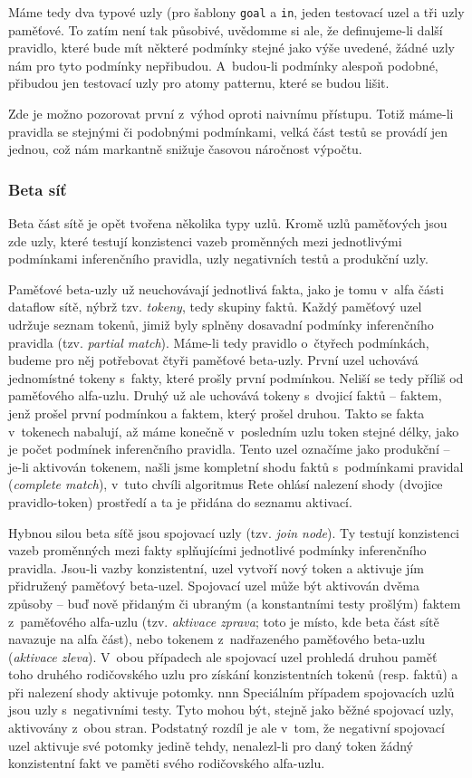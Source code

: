Máme tedy dva typové uzly (pro šablony \verb|goal| a \verb|in|, jeden
testovací uzel a tři uzly paměťové. To zatím není tak působivé,
uvědomme si ale, že definujeme-li další pravidlo, které bude mít
některé podmínky stejné jako výše uvedené, žádné uzly nám pro tyto
podmínky nepřibudou. A~budou-li podmínky alespoň podobné, přibudou
jen testovací uzly pro atomy patternu, které se budou lišit.

Zde je možno pozorovat první z~výhod oproti naivnímu přístupu. Totiž
máme-li pravidla se stejnými či podobnými podmínkami, velká část testů
se provádí jen jednou, což nám markantně snižuje časovou náročnost výpočtu.
\subsubsection{Beta síť}
Beta část sítě je opět tvořena několika typy uzlů. Kromě uzlů paměťových
jsou zde uzly, které testují konzistenci vazeb proměnných mezi jednotlivými
podmínkami inferenčního pravidla, uzly negativních testů a produkční uzly.

Paměťové beta-uzly už neuchovávají jednotlivá fakta, jako je tomu v~alfa
části dataflow sítě, nýbrž tzv. \emph{tokeny}, tedy skupiny faktů. Každý
paměťový uzel udržuje seznam tokenů, jimiž byly splněny dosavadní podmínky
inferenčního pravidla (tzv. \emph{partial match}). Máme-li tedy pravidlo
o~čtyřech podmínkách, budeme pro něj potřebovat čtyři paměťové beta-uzly.
První uzel uchovává jednomístné tokeny s~fakty, které prošly první podmínkou.
Neliší se tedy příliš od paměťového alfa-uzlu. Druhý už ale uchovává tokeny
s~dvojicí faktů -- faktem, jenž prošel první podmínkou a faktem, který prošel
druhou. Takto se fakta v~tokenech nabalují, až máme konečně v~posledním uzlu
token stejné délky, jako je počet podmínek inferenčního pravidla. Tento uzel
označíme jako produkční -- je-li aktivován tokenem, našli jsme kompletní
shodu faktů s~podmínkami pravidal (\emph{complete match}), v~tuto chvíli
algoritmus Rete ohlásí nalezení shody (dvojice pravidlo-token) prostředí
a ta je přidána do seznamu aktivací.

Hybnou silou beta síťě jsou spojovací uzly (tzv. \emph{join node}). Ty
testují konzistenci vazeb proměnných mezi fakty splňujícími jednotlivé
podmínky inferenčního pravidla. Jsou-li vazby konzistentní, uzel vytvoří
nový token a aktivuje jím přidružený paměťový beta-uzel. Spojovací uzel
může být aktivován dvěma způsoby -- buď nově přidaným či ubraným
(a konstantními testy prošlým) faktem z~paměťového alfa-uzlu (tzv.
\emph{aktivace zprava}; toto je místo, kde beta část sítě navazuje na alfa
část), nebo tokenem z~nadřazeného paměťového beta-uzlu (\emph{aktivace
zleva}). V~obou případech ale spojovací uzel prohledá druhou paměť toho
druhého rodičovského uzlu pro získání konzistentních tokenů (resp. faktů)
a při nalezení shody aktivuje potomky.
nnn
Speciálním případem spojovacích uzlů jsou uzly s~negativními testy. Tyto
mohou být, stejně jako běžné spojovací uzly, aktivovány z~obou stran.
Podstatný rozdíl je ale v~tom, že negativní spojovací uzel aktivuje své
potomky jedině tehdy, nenalezl-li pro daný token žádný konzistentní fakt
ve paměti svého rodičovského alfa-uzlu.

